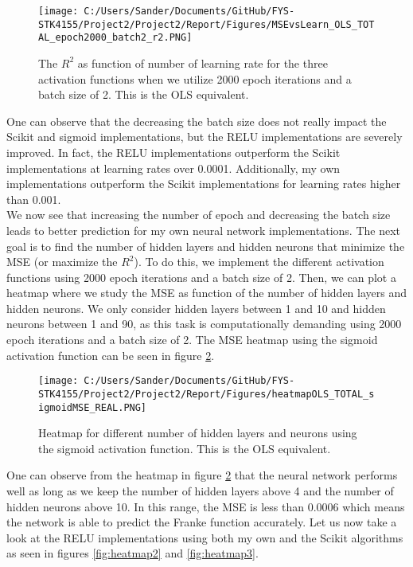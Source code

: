 \documentclass[12pt,a4paper]{article}
\begin{document}
\begin{figure}[H]
\centering
\texttt{[image: C:/Users/Sander/Documents/GitHub/FYS-STK4155/Project2/Project2/Report/Figures/MSEvsLearn\_OLS\_TOTAL\_epoch2000\_batch2\_r2.PNG]}
\caption{\label{fig:MSEvsLrateTOTAL8} The $R^2$ as function of number of learning rate for the three activation functions when we utilize 2000 epoch iterations and a batch size of 2. This is the OLS equivalent.}
\end{figure}

\noindent One can observe that the decreasing the batch size does not really impact the Scikit and sigmoid implementations, but the RELU implementations are severely improved. In fact, the RELU implementations outperform the Scikit implementations at learning rates over 0.0001. Additionally, my own implementations outperform the Scikit implementations for learning rates higher than 0.001.
\\
We now see that increasing the number of epoch and decreasing the batch size leads to better prediction for my own neural network implementations. The next goal is to find the number of hidden layers and hidden neurons that minimize the MSE (or maximize the $R^2$). To do this, we implement the different activation functions using 2000 epoch iterations and a batch size of 2. Then, we can plot a heatmap where we study the MSE as function of the number of hidden layers and hidden neurons. We only consider hidden layers between 1 and 10 and hidden neurons between 1 and 90, as this task is computationally demanding using 2000 epoch iterations and a batch size of 2. The MSE heatmap using the sigmoid activation function can be seen in figure \ref{fig:heatmap1}.

\begin{figure}[H]
\centering
\texttt{[image: C:/Users/Sander/Documents/GitHub/FYS-STK4155/Project2/Project2/Report/Figures/heatmapOLS\_TOTAL\_sigmoidMSE\_REAL.PNG]}
\caption{\label{fig:heatmap1} Heatmap for different number of hidden layers and neurons using the sigmoid activation function. This is the OLS equivalent.}
\end{figure}

\noindent One can observe from the heatmap in figure \ref{fig:heatmap1} that the neural network performs well as long as we keep the number of hidden layers above 4 and the number of hidden neurons above 10. In this range, the MSE is less than $0.0006$ which means the network is able to predict the Franke function accurately. Let us now take a look at the RELU implementations using both my own and the Scikit algorithms as seen in figures \ref{fig:heatmap2} and \ref{fig:heatmap3}.
\end{document}

